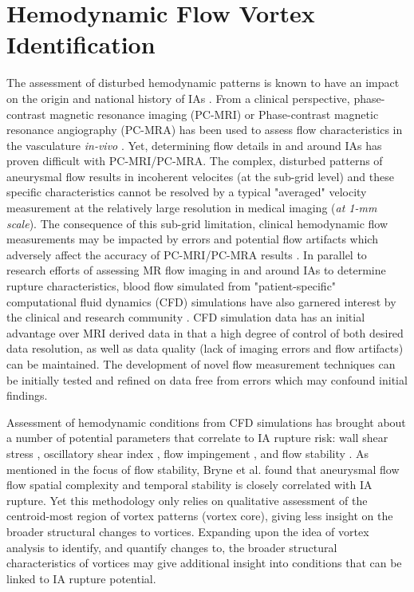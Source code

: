 \cleartooddpage[\thispagestyle{empty}]
\chapter{Hemodynamic Flow Vortex Identification}\label{CHAPTER2}

The assessment of disturbed hemodynamic patterns is known to have an impact on the origin and national history of IAs \cite{weir2002unruptured,brisman2006cerebral}. From a clinical perspective, phase-contrast magnetic resonance imaging (PC-MRI) or Phase-contrast magnetic resonance angiography (PC-MRA) has been used to assess flow characteristics in the vasculature \textit{in-vivo} \cite{benndorf1996intraaneurysmal,meckel2008vivo}. Yet, determining flow details in and around IAs has proven difficult with PC-MRI/PC-MRA. The complex, disturbed patterns of aneurysmal flow results in incoherent velocites (at the sub-grid level) and these specific characteristics cannot be resolved by a typical "averaged" velocity measurement at the relatively large resolution in medical imaging (\textit{at 1-mm scale}). The consequence of this sub-grid limitation, clinical hemodynamic flow measurements may be impacted by errors and potential flow artifacts which adversely affect the accuracy of PC-MRI/PC-MRA results \cite{strater20184d,meckel2008vivo}. In parallel to research efforts of assessing MR flow imaging in and around IAs to determine rupture characteristics, blood flow simulated from "patient-specific" computational fluid dynamics (CFD) simulations \cite{steinman2002image} have also garnered interest by the clinical and research community \cite{xiang2011hemodynamic,cebral2011association}. CFD simulation data has an initial advantage over MRI derived data in that a high degree of control of both desired data resolution, as well as data quality (lack of imaging errors and flow artifacts) can be maintained. The development of novel flow measurement techniques can be initially tested and refined on data free from errors which may confound initial findings.

Assessment of hemodynamic conditions from CFD simulations has brought about a number of potential parameters that correlate to IA rupture risk: wall shear stress \cite{baek2009flow}, oscillatory shear index \cite{steinman2003image}, flow impingement \cite{cebral2011association}, and flow stability \cite{byrne2014quantifying}. As mentioned in the focus of flow stability, Bryne et al. \cite{byrne2014quantifying} found that aneurysmal flow flow spatial complexity and temporal stability is closely correlated with IA rupture. Yet this methodology only relies on qualitative assessment of the centroid-most region of vortex patterns (vortex core), giving less insight on the broader structural changes to vortices. Expanding upon the idea of vortex analysis to identify, and quantify changes to, the broader structural characteristics of vortices may give additional insight into conditions that can be linked to IA rupture potential.

